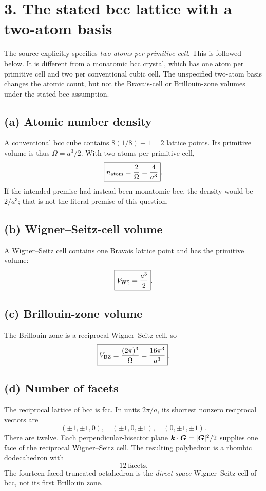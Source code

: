 \section*{3. The stated bcc lattice with a two-atom basis}
\begin{sourceNote}
The source explicitly specifies \emph{two atoms per primitive cell}. This is followed below. It is different from a monatomic bcc crystal, which has one atom per primitive cell and two per conventional cubic cell. The unspecified two-atom basis changes the atomic count, but not the Bravais-cell or Brillouin-zone volumes under the stated bcc assumption.
\end{sourceNote}
\subsection*{(a) Atomic number density}
A conventional bcc cube contains $8(1/8)+1=2$ lattice points. Its primitive volume is thus $\Omega=a^3/2$. With two atoms per primitive cell,
\[
\boxed{n_{\rm atom}=\frac2\Omega=\frac4{a^3}}.
\]
If the intended premise had instead been monatomic bcc, the density would be $2/a^3$; that is not the literal premise of this question.

\subsection*{(b) Wigner--Seitz-cell volume}
A Wigner--Seitz cell contains one Bravais lattice point and has the primitive volume:
\[
\boxed{V_{\rm WS}=\frac{a^3}{2}}.
\]

\subsection*{(c) Brillouin-zone volume}
The Brillouin zone is a reciprocal Wigner--Seitz cell, so
\[
\boxed{V_{\rm BZ}=\frac{(2\pi)^3}{\Omega}=\frac{16\pi^3}{a^3}}.
\]

\subsection*{(d) Number of facets}
The reciprocal lattice of bcc is fcc. In units $2\pi/a$, its shortest nonzero reciprocal vectors are
\[
(\pm1,\pm1,0),\quad(\pm1,0,\pm1),\quad(0,\pm1,\pm1).
\]
There are twelve. Each perpendicular-bisector plane
$\boldsymbol{k}\cdot\boldsymbol{G}=|\boldsymbol{G}|^2/2$ supplies one face of the reciprocal Wigner--Seitz cell. The resulting polyhedron is a rhombic dodecahedron with
\[
\boxed{12\ \text{facets}}.
\]
The fourteen-faced truncated octahedron is the \emph{direct-space} Wigner--Seitz cell of bcc, not its first Brillouin zone.

